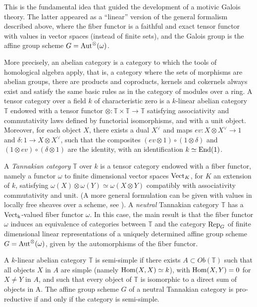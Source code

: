 \documentclass[10pt]{amsart}
\def\T{{\mathbb T}}
\def\Aut{\mathop{\rm Aut}\nolimits}
\def\End{\mathop{\rm End}\nolimits}
\def\Hom{\mathop{\rm Hom}\nolimits}
\numberwithin{equation}{section}
\begin{document}
\smallskip

This is the fundamental idea that guided the development of a motivic
Galois theory. The latter appeared as a ``linear'' version of the general
formalism described above, where the fiber functor is a faithful and
exact tensor functor with values in vector spaces (instead of finite
sets), and the Galois group is the affine group scheme
$G=\Aut^\otimes(\omega)$.

\smallskip

More precisely, an abelian category is a category to which the
tools of homological algebra apply, that is, a category where the
sets of morphisms are abelian groups, there are products and
coproducts,  kernels and cokernels always exist and satisfy the
same basic rules as in the category of modules over a ring. A
tensor category over a field $k$ of characteristic zero is a
$k$-linear abelian category $\T$ endowed with a tensor functor
$\otimes: \T\times \T \to \T$ satisfying associativity and
commutativity laws defined by functorial isomorphisms, and with a
unit object. Moreover, for each object $X$, there exists a dual
$X^\vee$ and maps $ev: X\otimes X^\vee \to 1$ and $\delta: 1 \to X
\otimes X^\vee$, such that the composites $(ev\otimes 1) \circ
(1\otimes \delta)$ and $(1\otimes ev) \circ (\delta \otimes 1)$
are the identity, with an identification $k \simeq \End(1)$.

\smallskip

A {\em Tannakian category} $\T$ over $k$ is a tensor category
endowed with a fiber functor, namely a functor $\omega$ to finite
dimensional vector spaces ${\rm Vect}_K$, for $K$ an extension of
$k$, satisfying $\omega(X)\otimes \omega(Y)\simeq \omega(X\otimes
Y)$ compatibly with associativity commutativity and unit. (A more
general formulation can be given with values in locally free
sheaves over a scheme, see \cite{De2}). A {\em neutral} Tannakian
category $\T$ has a ${\rm Vect_k}$-valued fiber functor $\omega$.
In this case, the main result is that the fiber functor $\omega$
induces an equivalence of categories between $\T$ and the category
${\rm Rep}_G$ of finite dimensional linear representations of a
uniquely determined affine group scheme $G=\Aut^\otimes(\omega)$,
given by the automorphisms of the fiber functor.

\smallskip

A $k$-linear abelian category $\T$ is semi-simple if there exists
$A\subset Ob(\T)$ such that all objects $X$ in $A$ are simple (namely
$\Hom(X,X)\simeq k$), with $\Hom(X,Y)=0$ for $X\neq Y$ in $A$, and such
that every object of $\T$ is isomorphic to a direct sum of objects
in A. The affine group scheme $G$ of a neutral Tannakian category
is pro-reductive if and only if the category is semi-simple.
\end{document}
